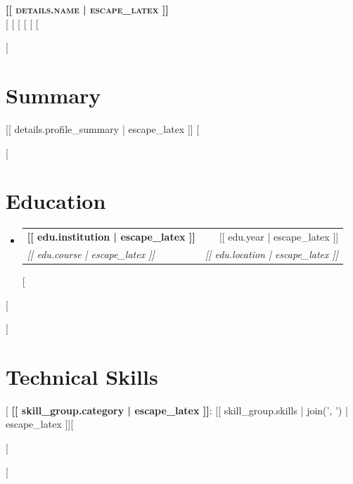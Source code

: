 \documentclass[letterpaper,11pt]{article}
\makeatletter
\newcommand{\resumeSubheading}[4]{
  \vspace{-2pt}\item
  \begin{tabular*}{0.97\textwidth}[t]{l@{\extracolsep{\fill}}r}
    \textbf{#1} & #2 \\
    \textit{\small#3} & \textit{\small #4} \\
  \end{tabular*}\vspace{-7pt}
}
\newcommand{\resumeSubHeadingListStart}{\begin{itemize}[leftmargin=0.15in, label={}]}
\newcommand{\resumeSubHeadingListEnd}{\end{itemize}}
\makeatother
\begin{document}
\begin{center}
  \textbf{\Huge \scshape [[ details.name | escape_latex ]]} \\ \vspace{1pt}
  \small 
  [%
  [%
  [%
  [%
  [%
  [%
\end{center}

[%
\section{Summary}
\small [[ details.profile_summary | escape_latex ]]
\vspace{-10pt}
[%

[%
\section{Education}
  \resumeSubHeadingListStart
    [%
    \resumeSubheading
      {[[ edu.institution | escape_latex ]]}{[[ edu.year | escape_latex ]]}
      {[[ edu.course | escape_latex ]]}{[[ edu.location | escape_latex ]]}
    [%
  \resumeSubHeadingListEnd
[%

[%
\section{Technical Skills}
 \begin{itemize}[leftmargin=0.15in, label={}]
    \small{\item{
    [%
     \textbf{[[ skill_group.category | escape_latex ]]}{: [[ skill_group.skills | join(', ') | escape_latex ]]}[%

    [%
    }}
 \end{itemize}
[%
\end{document}
